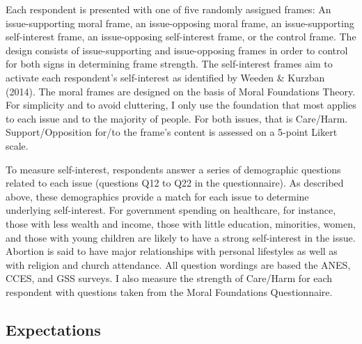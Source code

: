 \documentclass[12pt,econ]{sources/authesis}
\begin{document}
Each respondent is presented with one of five randomly assigned frames: An issue-supporting moral frame, an issue-opposing moral frame, an issue-supporting self-interest frame, an issue-opposing self-interest frame, or the control frame. The design consists of issue-supporting and issue-opposing frames in order to control for both signs in determining frame strength. The self-interest frames aim to activate each respondent's self-interest as identified by Weeden \& Kurzban (2014). The moral frames are designed on the basis of Moral Foundations Theory. For simplicity and to avoid cluttering, I only use the foundation that most applies to each issue and to the majority of people. For both issues, that is Care/Harm. Support/Opposition for/to the frame's content is assessed on a 5-point Likert scale.

To measure self-interest, respondents answer a series of demographic questions related to each issue (questions Q12 to Q22 in the questionnaire). As described above, these demographics provide a match for each issue to determine underlying self-interest. For government spending on healthcare, for instance, those with less wealth and income, those with little education, minorities, women, and those with young children are likely to have a strong self-interest in the issue. Abortion is said to have major relationships with personal lifestyles as well as with religion and church attendance. All question wordings are based the ANES, CCES, and GSS surveys. I also measure the strength of Care/Harm for each respondent with questions taken from the Moral Foundations Questionnaire.

\hypertarget{framing-design-expectations}{%
\subsection{Expectations}\label{framing-design-expectations}}
\end{document}
